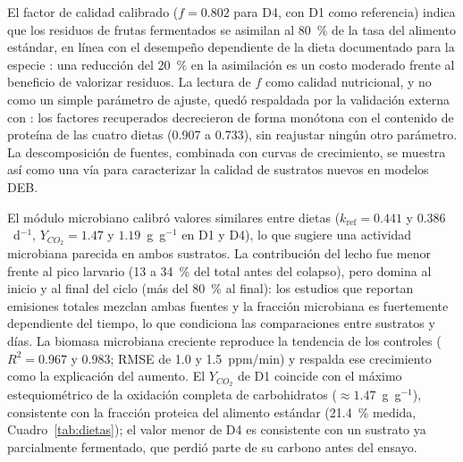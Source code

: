 El factor de calidad calibrado ($f = 0.802$ para D4, con D1 como referencia) indica que los residuos de frutas fermentados se asimilan al 80~\% de la tasa del alimento estándar, en línea con el desempeño dependiente de la dieta documentado para la especie \parencite{laganaroGrowthMetabolicPerformance2021a,eriksenMetabolicPerformanceFeed2024}: una reducción del 20~\% en la asimilación es un costo moderado frente al beneficio de valorizar residuos. La lectura de $f$ como calidad nutricional, y no como un simple parámetro de ajuste, quedó respaldada por la validación externa con \textcite{schonUsingGasExchange2026}: los factores recuperados decrecieron de forma monótona con el contenido de proteína de las cuatro dietas (0.907 a 0.733), sin reajustar ningún otro parámetro. La descomposición de fuentes, combinada con curvas de crecimiento, se muestra así como una vía para caracterizar la calidad de sustratos nuevos en modelos DEB.

El módulo microbiano calibró valores similares entre dietas ($k_{\mathrm{ref}} = 0.441$ y $0.386$~d$^{-1}$, $Y_{CO_2} = 1.47$ y $1.19$~g~g$^{-1}$ en D1 y D4), lo que sugiere una actividad microbiana parecida en ambos sustratos. La contribución del lecho fue menor frente al pico larvario (13 a 34~\% del total antes del colapso), pero domina al inicio y al final del ciclo (más del 80~\% al final): los estudios que reportan emisiones totales \parencite{ermolaevGreenhouseGasEmissions2019,parodiBioconversionEfficienciesGreenhouse2020a,boakye-yiadomGreenhouseGasEmissions2022,lindbergProcessEfficiencyGreenhouse2022a} mezclan ambas fuentes y la fracción microbiana es fuertemente dependiente del tiempo, lo que condiciona las comparaciones entre sustratos y días. La biomasa microbiana creciente reproduce la tendencia de los controles ($R^2 = 0.967$ y $0.983$; RMSE de 1.0 y 1.5~ppm/min) y respalda ese crecimiento como la explicación del aumento. El $Y_{CO_2}$ de D1 coincide con el máximo estequiométrico de la oxidación completa de carbohidratos ($\approx 1.47$~g~g$^{-1}$), consistente con la fracción proteica del alimento estándar (21.4~\% medida, Cuadro~\ref{tab:dietas}); el valor menor de D4 es consistente con un sustrato ya parcialmente fermentado, que perdió parte de su carbono antes del ensayo.

